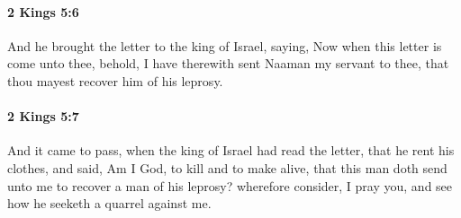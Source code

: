 		\paragraph{2 Kings 5:6} %
			\label{2KINGS-5-6}

			And he brought the letter to the king of Israel, saying, Now when this letter is come unto thee, behold, I have therewith sent Naaman my servant to thee, that thou mayest recover him of his leprosy.


		\paragraph{2 Kings 5:7} %
			\label{2KINGS-5-7}

			And it came to pass, when the king of Israel had read the letter, that he rent his clothes, and said, Am I God, to kill and to make alive, that this man doth send unto me to recover a man of his leprosy? wherefore consider, I pray you, and see how he seeketh a quarrel against me.

